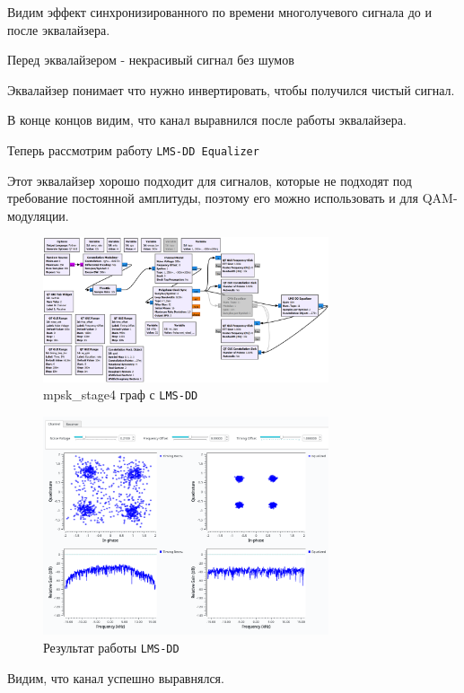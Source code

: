 \documentclass[a4paper,12pt]{article}
\begin{document}
	Видим эффект синхронизированного по времени многолучевого сигнала до и после эквалайзера. 
	
	Перед эквалайзером - некрасивый сигнал без шумов
	
	Эквалайзер понимает что нужно инвертировать, чтобы получился чистый сигнал.
	
	В конце концов видим, что канал выравнился после работы эквалайзера.
	
	Теперь рассмотрим работу \texttt{LMS-DD Equalizer}
	
	Этот эквалайзер хорошо подходит для сигналов, которые не подходят под требование постоянной амплитуды, поэтому его можно использовать и для QAM-модуляции.
	
	\begin{figure}[H]
		\centering
		\includegraphics[width=0.75\textwidth]{5_3.png}
		\caption{mpsk\_stage4 граф с \texttt{LMS-DD}}
		\label{fig:5.3}
	\end{figure}
	
	\begin{figure}[H]
		\centering
		\includegraphics[width=0.75\textwidth]{5_4.png}
		\caption{Результат работы \texttt{LMS-DD}}
		\label{fig:5.4}
	\end{figure}
	
	Видим, что канал успешно выравнялся.
	
\end{document}
